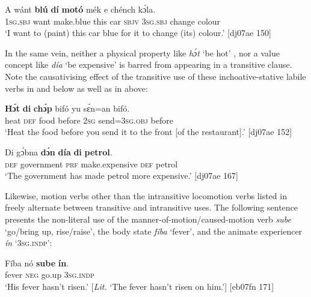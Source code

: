 \ea%
    \label{ex:key:1105}
    \gll A    wánt  \textbf{blú}      \textbf{dí}  \textbf{motó}  mék    e    chénch  kɔ́la.\\
\textsc{1sg.sbj}  want  make.blue  this  car    \textsc{sbjv}    \textsc{3sg.sbj}  change  colour\\

\glt ‘I want to (paint) this car blue for it to change (its) colour.’ [dj07ae 150]
\z

In the same vein, neither a physical property like \textit{hɔ́t} ‘be hot’ , nor a value concept like \textit{día} ‘be expensive’  is barred from appearing in a transitive clause. Note the causativising effect of the transitive use of these inchoative-stative labile verbs in  and  below as well as in  above: 

\ea%
    \label{ex:key:1106}
    \gll \textbf{Hɔ́t}    \textbf{di}  \textbf{chɔ́p}  bifó    yu  sɛ́n=an    bifó.\\
heat    \textsc{def}  food    before  \textsc{2sg}  send=\textsc{3sg.obj}  before\\

\glt ‘Heat the food before you send it to the front [of the restaurant].’ [dj07ae 152]
\z


\ea%
    \label{ex:key:1107}
    \gll Di  gɔ́bna    \textbf{dɔ́n}  \textbf{día}        \textbf{di}  \textbf{petrol}.\\
\textsc{def}  government  \textsc{prf}  make.expensive  \textsc{def}  petrol\\

\glt ‘The government has made petrol more expensive.’ [dj07ae 167]
\z

Likewise, motion verbs other than the intransitive locomotion verbs listed in  freely alternate between transitive and intransitive uses. The following sentence presents the non-literal use of the manner-of-motion/caused-motion verb \textit{sube} ‘go/bring up, rise/raise’, the body state \textit{fíba} ‘fever’, and the animate experiencer \textit{ín} ‘\textsc{3sg.indp}’: 


\ea%
    \label{ex:key:1108}
    \gll Fíba    nó  \textbf{sube}  \textbf{ín}.\\
fever  \textsc{neg}  go.up  \textsc{3sg.indp}\\

\glt ‘His fever hasn’t risen.’ [\textit{Lit.} ‘The fever hasn’t risen on him.’] [eb07fn 171]
\z

